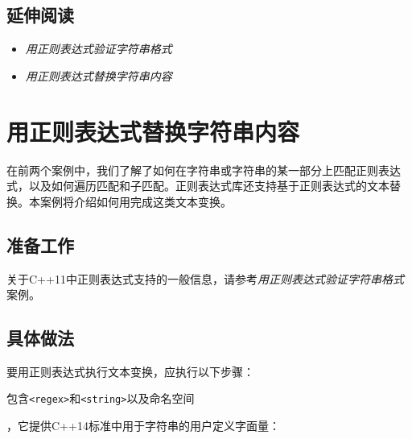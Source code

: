 
\subsection{延伸阅读}



\begin{itemize}
\item \textit{用正则表达式验证字符串格式}



\item \textit{用正则表达式替换字符串内容}

\end{itemize}



\section{用正则表达式替换字符串内容}



在前两个案例中，我们了解了如何在字符串或字符串的某一部分上匹配正则表达式，以及如何遍历匹配和子匹配。正则表达式库还支持基于正则表达式的文本替换。本案例将介绍如何用完成这类文本变换。



\subsection{准备工作}



关于C++11中正则表达式支持的一般信息，请参考\textit{用正则表达式}\textit{验证字符串格式}案例。



\subsection{具体做法}



要用正则表达式执行文本变换，应执行以下步骤：



包含\texttt{<\allowbreak{}regex>}和\texttt{<\allowbreak{}string>}以及命名空间



，它提供C++14标准中用于字符串的用户定义字面量：


